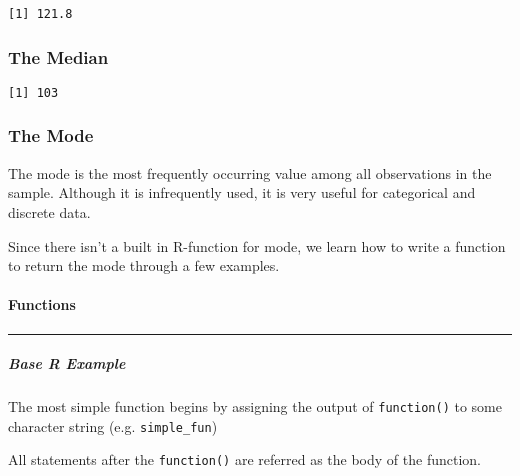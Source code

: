 \documentclass[12pt,]{article}
\newenvironment{Shaded}{\begin{snugshade}}{\end{snugshade}}
\newcommand{\KeywordTok}[1]{\textcolor[rgb]{0.13,0.29,0.53}{\textbf{#1}}}
\newcommand{\OperatorTok}[1]{\textcolor[rgb]{0.81,0.36,0.00}{\textbf{#1}}}
\newcommand{\NormalTok}[1]{#1}
\let\oldparagraph\paragraph
\renewcommand{\paragraph}[1]{\oldparagraph{#1}\mbox{}}
\let\oldsubparagraph\subparagraph
\renewcommand{\subparagraph}[1]{\oldsubparagraph{#1}\mbox{}}
\theoremstyle{definition}
\theoremstyle{definition}
\theoremstyle{definition}
\theoremstyle{remark}
\begin{document}
\begin{Shaded}
\end{Shaded}

\begin{verbatim}
[1] 121.8
\end{verbatim}

\subsubsection{The Median}\label{the-median}

\begin{Shaded}
\end{Shaded}

\begin{verbatim}
[1] 103
\end{verbatim}

\subsubsection{The Mode}\label{the-mode}

The mode is the most frequently occurring value among all observations
in the sample. Although it is infrequently used, it is very useful for
categorical and discrete data.

Since there isn't a built in R-function for mode, we learn how to write
a function to return the mode through a few examples.

\paragraph{Functions}\label{functions}

\begin{center}\rule{0.5\linewidth}{\linethickness}\end{center}

\subparagraph{Base R Example}\label{base-r-example}

The most simple function begins by assigning the output of
\texttt{function()} to some character string (e.g. \texttt{simple\_fun})

All statements after the \texttt{function()} are referred as the body of
the function.
\end{document}
